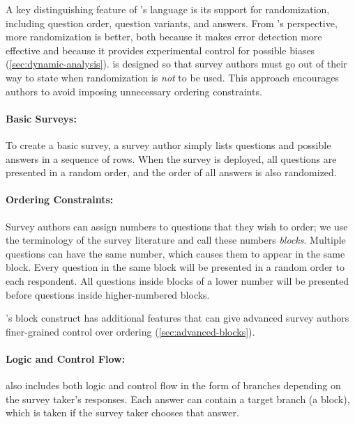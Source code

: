 A key distinguishing feature of \surveyman{}'s language is its support
for randomization, including question order, question variants, and
answers. From \surveyman{}'s perspective, more randomization is
better, both because it makes error detection more effective and
because it provides experimental control for possible biases
(\ref{sec:dynamic-analysis}). \surveyman{} is designed so that
survey authors must go out of their way to state when randomization is
\emph{not} to be used. This approach encourages authors to avoid
imposing unnecessary ordering constraints.

\paragraph{Basic Surveys:}
To create a basic survey, a survey author simply lists questions and
possible answers in a sequence of rows. When the survey is deployed,
all questions are presented in a random order, and the order of all
answers is also randomized.

\paragraph{Ordering Constraints:}
Survey authors can assign numbers to questions that they wish
to order; we use the terminology of the survey literature and call these numbers
\emph{blocks}. Multiple questions can have the same number, which
causes them to appear in the same block. Every question in the same block will be
presented in a random order to each respondent. All questions inside
blocks of a lower number will be presented before questions inside
higher-numbered blocks.

\surveyman{}'s block construct has additional features that can give
advanced survey authors finer-grained control over ordering
(\ref{sec:advanced-blocks}).

\paragraph{Logic and Control Flow:}
\surveyman{} also includes both logic and control flow in the form of
branches depending on the survey taker's responses. Each answer can
contain a target branch (a block), which is taken if the survey taker
chooses that answer.





